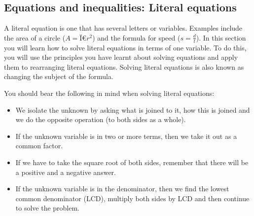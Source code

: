     
    
    
    
    
  \label{m39258*eip-798}
            \subsection{ Equations and inequalities: Literal equations}
            \nopagebreak
            
\label{m39258*eip-224}A literal equation is one that has several letters or variables. Examples include the area of a circle (\begin{math}A=\mathrm{Ï€}{r}^{2}\end{math}) and the formula for speed (\begin{math}s=\frac{d}{t}\end{math}). In this section you will learn how to solve literal equations in terms of one variable. To do this, you will use the principles you have learnt about solving equations and apply them to rearranging literal equations. Solving literal equations is also known as changing the subject of the formula.
\par 
\label{m39258*id9732423}
You should bear the following in mind when solving literal equations: \label{m39258*id987324}\begin{itemize}[noitemsep]
            \item We isolate the unknown by asking what is joined to it, how this is joined and we do the opposite operation (to both sides as a whole).
\item If the unknown variable is in two or more terms, then we take it out as a common factor. 
\item  If we have to take the square root of both sides, remember that there will be a positive and a negative answer.
\item  If the unknown variable is in the denominator, then we find the lowest common denominator (LCD), multiply both sides by LCD and then continue to solve the problem.
\end{itemize}
        
\par 
\par
            \label{m39258*eip-979}\vspace{.5cm} 
      
